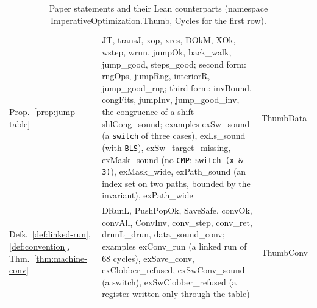 \documentclass[oneside,english]{amsart}
\numberwithin{equation}{section}
\theoremstyle{plain}
\theoremstyle{definition}
\theoremstyle{plain}
\theoremstyle{plain}
\theoremstyle{remark}
\newcommand{\lean}[1]{{\ttfamily\small #1}}
\begin{document}
\begin{table}[ht]
\begin{tabular}{@{}>{\raggedright\arraybackslash}p{}>{\raggedright\arraybackslash}p{}>{\raggedright\arraybackslash}p{}@{}}
Prop.~\ref{prop:jump-table} & \lean{JT}, \lean{transJ}, \lean{xop}, \lean{xres}, \lean{DOkM}, \lean{XOk}, \lean{wstep}, \lean{wrun}, \lean{jumpOk}, \lean{back\_\allowbreak walk}, \lean{jump\_\allowbreak good}, \lean{steps\_\allowbreak good}; second form: \lean{rngOps}, \lean{jumpRng}, \lean{interiorR}, \lean{jump\_\allowbreak good\_\allowbreak rng}; third form: \lean{invBound}, \lean{congFits}, \lean{jumpInv}, \lean{jump\_\allowbreak good\_\allowbreak inv}, the congruence of a shift \lean{shlCong\_\allowbreak sound}; examples \lean{exSw\_\allowbreak sound} (a \texttt{switch} of three cases), \lean{exLs\_\allowbreak sound} (with \texttt{BLS}), \lean{exSw\_\allowbreak target\_\allowbreak missing}, \lean{exMask\_\allowbreak sound} (no \texttt{CMP}: \texttt{switch (x \& 3)}), \lean{exMask\_\allowbreak wide}, \lean{exPath\_\allowbreak sound} (an index set on two paths, bounded by the invariant), \lean{exPath\_\allowbreak wide} & \lean{ThumbData} \\
Defs.~\ref{def:linked-run}, \ref{def:convention}, Thm.~\ref{thm:machine-conv} & \lean{DRunL}, \lean{PushPopOk}, \lean{SaveSafe}, \lean{convOk}, \lean{convAll}, \lean{ConvInv}, \lean{conv\_\allowbreak step}, \lean{conv\_\allowbreak ret}, \lean{drunL\_\allowbreak drun}, \lean{data\_\allowbreak sound\_\allowbreak conv}; examples \lean{exConv\_\allowbreak run} (a linked run of 68 cycles), \lean{exSave\_\allowbreak conv}, \lean{exClobber\_\allowbreak refused}, \lean{exSwConv\_\allowbreak sound} (a switch), \lean{exSwClobber\_\allowbreak refused} (a register written only through the table) & \lean{ThumbConv} \\
\bottomrule
\end{tabular}
\caption{Paper statements and their Lean counterparts (namespace \lean{ImperativeOptimization.Thumb}, \lean{Cycles} for the first row).}
\label{tab:lean3}
\end{table}
\end{document}
